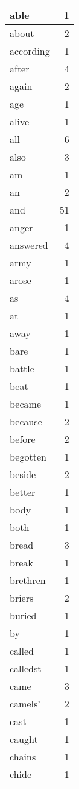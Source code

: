 \begin{center}
\begin{longtable}{l|r}
able & 1\\ \hline 
about & 2\\ \hline 
according & 1\\ \hline 
after & 4\\ \hline 
again & 2\\ \hline 
age & 1\\ \hline 
alive & 1\\ \hline 
all & 6\\ \hline 
also & 3\\ \hline 
am & 1\\ \hline 
an & 2\\ \hline 
and & 51\\ \hline 
anger & 1\\ \hline 
answered & 4\\ \hline 
army & 1\\ \hline 
arose & 1\\ \hline 
as & 4\\ \hline 
at & 1\\ \hline 
away & 1\\ \hline 
bare & 1\\ \hline 
battle & 1\\ \hline 
beat & 1\\ \hline 
became & 1\\ \hline 
because & 2\\ \hline 
before & 2\\ \hline 
begotten & 1\\ \hline 
beside & 2\\ \hline 
better & 1\\ \hline 
body & 1\\ \hline 
both & 1\\ \hline 
bread & 3\\ \hline 
break & 1\\ \hline 
brethren & 1\\ \hline 
briers & 2\\ \hline 
buried & 1\\ \hline 
by & 1\\ \hline 
called & 1\\ \hline 
calledst & 1\\ \hline 
came & 3\\ \hline 
camels' & 2\\ \hline 
cast & 1\\ \hline 
caught & 1\\ \hline 
chains & 1\\ \hline 
chide & 1\\ \hline 

\end{longtable}
\end{center}
